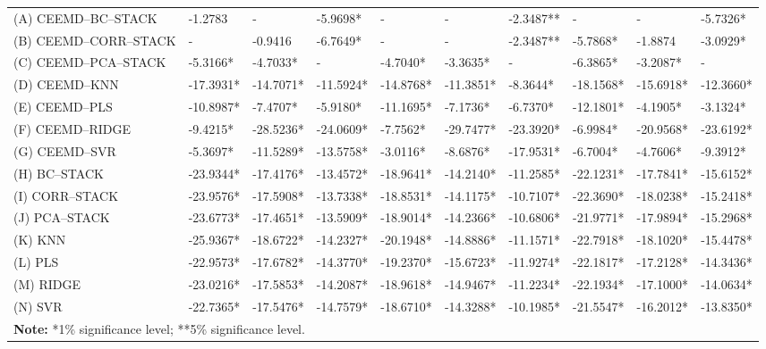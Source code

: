 {\begin{longtable}{llll|lll|lll}
(A) CEEMD--BC--STACK   & -1.2783   & -         & -5.9698*  & -         & -         & -2.3487** & -         & -         & -5.7326*  \\
(B) CEEMD--CORR--STACK & -         & -0.9416   & -6.7649*  & -         & -         & -2.3487** & -5.7868*  & -1.8874   & -3.0929*  \\
(C) CEEMD--PCA--STACK  & -5.3166*  & -4.7033*  & -         & -4.7040*  & -3.3635*  & -         & -6.3865*  & -3.2087*  & -         \\  \hline
(D) CEEMD--KNN         & -17.3931* & -14.7071* & -11.5924* & -14.8768* & -11.3851* & -8.3644*  & -18.1568* & -15.6918* & -12.3660* \\
(E) CEEMD--PLS         & -10.8987* & -7.4707*  & -5.9180*  & -11.1695* & -7.1736*  & -6.7370*  & -12.1801* & -4.1905*  & -3.1324*  \\
(F) CEEMD--RIDGE       & -9.4215*  & -28.5236* & -24.0609* & -7.7562*  & -29.7477* & -23.3920* & -6.9984*  & -20.9568* & -23.6192* \\
(G) CEEMD--SVR         & -5.3697*  & -11.5289* & -13.5758* & -3.0116*  & -8.6876*  & -17.9531* & -6.7004*  & -4.7606*  & -9.3912*  \\ \hline
(H) BC--STACK          & -23.9344* & -17.4176* & -13.4572* & -18.9641* & -14.2140* & -11.2585* & -22.1231* & -17.7841* & -15.6152* \\
(I) CORR--STACK        & -23.9576* & -17.5908* & -13.7338* & -18.8531* & -14.1175* & -10.7107* & -22.3690* & -18.0238* & -15.2418* \\
(J) PCA--STACK         & -23.6773* & -17.4651* & -13.5909* & -18.9014* & -14.2366* & -10.6806* & -21.9771* & -17.9894* & -15.2968* \\ \hline
(K) KNN                & -25.9367* & -18.6722* & -14.2327* & -20.1948* & -14.8886* & -11.1571* & -22.7918* & -18.1020* & -15.4478* \\
(L) PLS                & -22.9573* & -17.6782* & -14.3770* & -19.2370* & -15.6723* & -11.9274* & -22.1817* & -17.2128* & -14.3436* \\
(M) RIDGE              & -23.0216* & -17.5853* & -14.2087* & -18.9618* & -14.9467* & -11.2234* & -22.1934* & -17.1000* & -14.0634* \\
(N) SVR                & -22.7365* & -17.5476* & -14.7579* & -18.6710* & -14.3288* & -10.1985* & -21.5547* & -16.2012* & -13.8350* \\ \hline
\multicolumn{10}{l}{\textbf{Note:} *1\% significance level; **5\% significance level.}                                                     
\end{longtable}
}